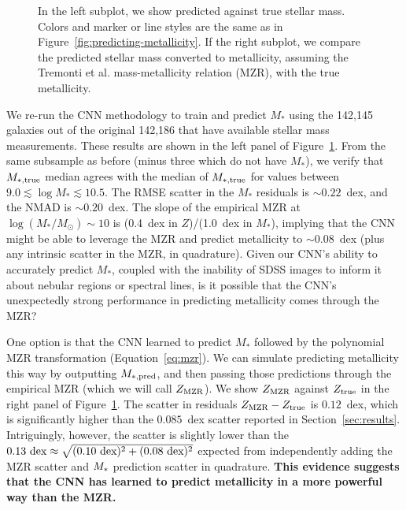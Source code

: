 \documentclass[fleqn,usenatbib]{mnras}
\begin{document}
\begin{figure}
	\caption{\label{fig:mass-metallicity}
		In the left subplot, we show predicted against true stellar mass. 
		Colors and marker or line styles are the same as in Figure~\ref{fig:predicting-metallicity}.
		If the right subplot, we compare the predicted stellar mass converted to metallicity, assuming the Tremonti et al. mass-metallicity relation (MZR), with the true metallicity.}
\end{figure}

We re-run the CNN methodology to train and predict $M_{\ast}$ using the 142,145 galaxies out of the original 142,186 that have available stellar mass measurements.
These results are shown in the left panel of Figure~\ref{fig:mass-metallicity}.
From the same subsample as before (minus three which do not have $M_{\ast}$), we verify that $M_{\rm \ast, true}$ median agrees with the median of $M_{\rm \ast, true}$ for values between $9.0 \lesssim \log M_\ast \lesssim 10.5$. 
The RMSE scatter in the $M_{\ast}$ residuals is $\sim 0.22$~dex, and the NMAD is $\sim 0.20$~dex.
The slope of the empirical MZR at $\log (M_\ast / M_\odot) \sim 10$ is (0.4~dex in $Z$)/(1.0~dex in $M_{\ast}$), implying that the CNN might be able to leverage the MZR and predict metallicity to $\sim 0.08$~dex (plus any intrinsic scatter in the MZR, in quadrature).
Given our CNN's ability to accurately predict $M_{\ast}$, coupled with the inability of SDSS images to inform it about nebular regions or spectral lines, is it possible that the CNN's unexpectedly strong performance in predicting metallicity comes through the MZR?

One option is that the CNN learned to predict $M_{\ast}$ followed by the polynomial MZR transformation (Equation~\ref{eq:mzr}).
We can simulate predicting metallicity this way by outputting $M_{\rm \ast, pred}$, and then passing those predictions through the empirical MZR (which we will call $Z_{\rm MZR}$).
We show $Z_{\rm MZR}$ against $Z_{\rm true}$ in the right panel of Figure~\ref{fig:mass-metallicity}.
The scatter in residuals $Z_{\rm MZR} - Z_{\rm true}$ is $0.12$~dex, which is significantly higher than the $0.085$~dex scatter reported in Section~\ref{sec:results}.
Intriguingly, however, the scatter is slightly lower than the $0.13{\rm ~ dex} \approx \sqrt{\rm (0.10~dex)^2 + (0.08~dex)^2}$ expected from independently adding the MZR scatter and $M_{\rm \ast}$ prediction scatter in quadrature.
\textbf{This evidence suggests that the CNN has learned to predict metallicity in a more powerful way than the MZR.}
\end{document}
